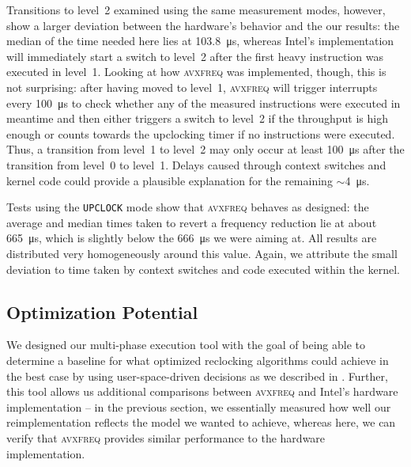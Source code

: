 Transitions to level~2 examined using the same measurement modes, however, show a larger deviation between the hardware's behavior and the our results: the median of the time needed here lies at \SI{103.8}{\micro\second}, whereas Intel's implementation will immediately start a switch to level~2 after the first heavy instruction was executed in level~1. Looking at how \textsc{avxfreq} was implemented, though, this is not surprising: after having moved to level~1, \textsc{avxfreq} will trigger interrupts every \SI{100}{\micro\second} to check whether any of the measured instructions were executed in meantime and then either triggers a switch to level~2 if the throughput is high enough or counts towards the upclocking timer if no instructions were executed. Thus, a transition from level~1 to level~2 may only occur at least \SI{100}{\micro\second} after the transition from level~0 to level~1. Delays caused through context switches and kernel code could provide a plausible explanation for the remaining $\sim$\SI{4}{\micro\second}.

Tests using the \texttt{UPCLOCK} mode show that \textsc{avxfreq} behaves as designed: the average and median times taken to revert a frequency reduction lie at about \SI{665}{\micro\second}, which is slightly below the \SI{666}{\micro\second} we were aiming at. All results are distributed very homogeneously around this value. Again, we attribute the small deviation to time taken by context switches and code executed within the kernel.

\subsection{Optimization Potential}
\label{sec:evaluation:results:stagedexecution}

We designed our multi-phase execution tool with the goal of being able to determine a baseline for what optimized reclocking algorithms could achieve in the best case by using user-space-driven decisions as we described in . Further, this tool allows us additional comparisons between \textsc{avxfreq} and Intel's hardware implementation -- in the previous section, we essentially measured how well our reimplementation reflects the model we wanted to achieve, whereas here, we can verify that \textsc{avxfreq} provides similar performance to the hardware implementation.


